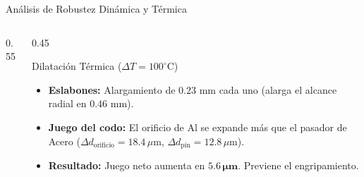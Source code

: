 \documentclass[aspectratio=169,11pt]{beamer}
\begin{document}
\begin{frame}{Análisis de Robustez Dinámica y Térmica}
    \begin{columns}
        \begin{column}{0.55\textwidth}
            \begin{table}[H]
                \centering
                \caption{Esfuerzos vs. Velocidad Tangencial.}
            \end{table}
        \end{column}
        \begin{column}{0.45\textwidth}
            \begin{block}{Dilatación Térmica ($\Delta T = 100^\circ$C)}
                \begin{itemize}
                    \item \textbf{Eslabones:} Alargamiento de $0.23\text{ mm}$ cada uno (alarga el alcance radial en $0.46\text{ mm}$).
                    \item \textbf{Juego del codo:} El orificio de Al se expande más que el pasador de Acero ($\Delta d_{\text{orificio}} = 18.4\,\mu\text{m}$, $\Delta d_{\text{pin}} = 12.8\,\mu\text{m}$).
                    \item \textbf{Resultado:} Juego neto aumenta en $\mathbf{5.6\,\mu\text{m}}$. Previene el engripamiento.
                \end{itemize}
            \end{block}
        \end{column}
    \end{columns}
\end{frame}
\end{document}
